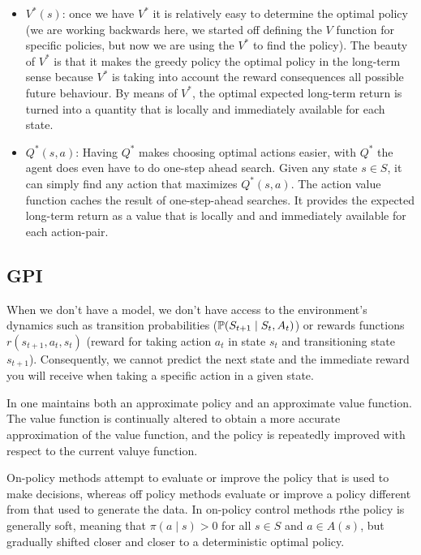\begin{itemize}
    \item $V^*(s)$: once we have $V^*$ it is relatively easy to determine the optimal policy (we are working backwards here, we started off defining the $V$ function for specific policies, but now we are using the $V^*$ to find the policy). The beauty of $V^*$ is that it makes the greedy policy the optimal policy in the long-term sense because $V^*$ is taking into account the reward consequences all possible future behaviour. By means of $V^*$, the optimal expected long-term return is turned into a quantity that is locally and immediately available for each state.
    
    \item $Q^*(s,a)$: Having $Q^*$ makes choosing optimal actions easier, with $Q^*$ the agent does even have to do one-step ahead search. Given any state $s \in S$, it can simply find any action that maximizes $Q^*(s,a)$. The action value function caches the result of one-step-ahead searches. It provides the expected long-term return as a value that is locally and and immediately available for each action-pair.
\end{itemize}





\subsection{GPI}
When we don't have a model, we don't have access to the environment's dynamics such as transition probabilities ($\mathbb P(S_{t+1} \mid S_t , A_t)$) or rewards functions $r(s_{t+1}, a_t, s_t)$ (reward for taking action $a_t$ in state $s_t$ and transitioning state $s_{t+1}$). Consequently, we cannot predict the next state and the immediate reward you will receive when taking a specific action in a given state. 

In  one maintains both an approximate policy and an approximate value function. The value function is continually altered to obtain a more accurate approximation of the value function, and the policy is repeatedly improved with respect to the current valuye function. 
 

On-policy methods attempt to evaluate or improve the policy that is used to make decisions, whereas off policy methods evaluate or improve a policy different from that used to generate the data. 
In on-policy control methods rthe policy is generally soft, meaning that $\pi(a \mid s) > 0$ for all $s \in S$ and $a \in A(s)$, but gradually shifted closer and closer to a deterministic optimal policy. 


